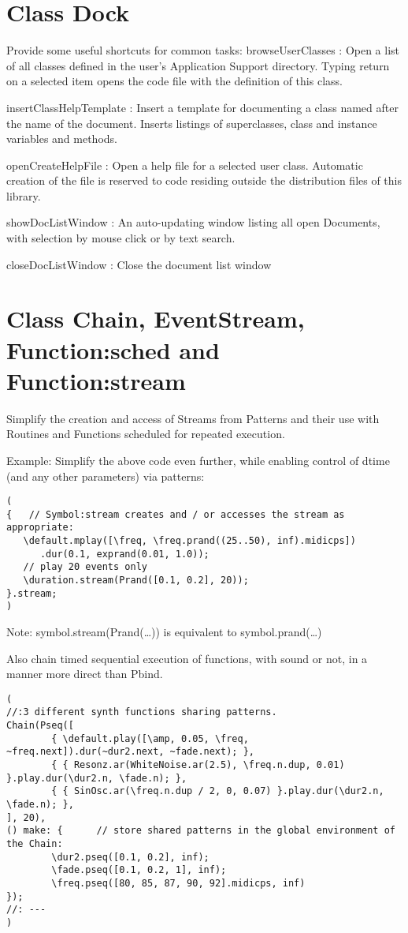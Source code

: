\documentclass[11pt, a4paper]{scrartcl}
\begin{document}
\section*{Class Dock}
\label{sec-11}


Provide some useful shortcuts for common tasks: 
   browseUserClasses :    Open a list of all classes defined in the user's Application Support 
      directory. Typing return on a selected item opens the code file with the definition of this class. 

   insertClassHelpTemplate : Insert a template for documenting a class named after the name of the
      document. Inserts listings of superclasses, class and instance variables and methods. 

   openCreateHelpFile : Open a help file for a selected user class. Automatic creation of the file 
         is reserved to code residing outside the distribution files of this library. 

   showDocListWindow :  An auto-updating window listing all open Documents, with selection by mouse click
               or by text search.

   closeDocListWindow : Close the document list window
\section*{Class Chain, EventStream, Function:sched and Function:stream}
\label{sec-12}


Simplify the creation and access of Streams from Patterns and their use with Routines and Functions scheduled for repeated execution.  

Example: Simplify the above code even further, while enabling  control of dtime (and any other parameters) via patterns:

\begin{verbatim}
(
{   // Symbol:stream creates and / or accesses the stream as appropriate: 
   \default.mplay([\freq, \freq.prand((25..50), inf).midicps])
      .dur(0.1, exprand(0.01, 1.0));
   // play 20 events only
   \duration.stream(Prand([0.1, 0.2], 20)); 
}.stream;    
)
\end{verbatim}

Note: symbol.stream(Prand(\ldots{})) is equivalent to symbol.prand(\ldots{})

Also chain timed sequential execution of functions, with sound or not, in a manner more direct than Pbind.

\begin{verbatim}
(
//:3 different synth functions sharing patterns. 
Chain(Pseq([
        { \default.play([\amp, 0.05, \freq, ~freq.next]).dur(~dur2.next, ~fade.next); },
        { { Resonz.ar(WhiteNoise.ar(2.5), \freq.n.dup, 0.01) }.play.dur(\dur2.n, \fade.n); },
        { { SinOsc.ar(\freq.n.dup / 2, 0, 0.07) }.play.dur(\dur2.n, \fade.n); },
], 20), 
() make: {      // store shared patterns in the global environment of the Chain:
        \dur2.pseq([0.1, 0.2], inf);
        \fade.pseq([0.1, 0.2, 1], inf); 
        \freq.pseq([80, 85, 87, 90, 92].midicps, inf) 
});
//: ---
)
\end{verbatim}
\end{document}
